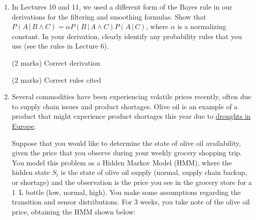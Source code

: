\documentclass[12pt]{article}
\begin{document}
\begin{enumerate}[font=\Large,label=(\alph*)]

\item
In Lectures 10 and 11, we used a different form of the Bayes rule in our derivations for the filtering and smoothing formulas. Show that $P(A\,|\,B \land C) = \alpha P(B\,|\,A \land C) P(A\,|\,C)$, where $\alpha$ is a normalizing constant. In your derivation, clearly identify any probability rules that you use (see the rules in Lecture 6).

\begin{markscheme}

(2 marks) Correct derivation

(2 marks) Correct rules cited

\end{markscheme}

\item
Several commodities have been experiencing volatile prices recently, often due to supply chain issues and product shortages. Olive oil is an example of a product that might experience product shortages this year due to \href{https://www.cnn.com/interactive/2022/09/business/olive-oil-shortage-drought-cnnphotos/}{droughts in Europe}.

Suppose that you would like to determine the state of olive oil availability, given the price that you observe during your weekly grocery shopping trip. You model this problem as a Hidden Markov Model (HMM), where the hidden state $S_t$ is the state of olive oil supply (normal, supply chain backup, or shortage) and the observation is the price you see in the grocery store for a \SI{1}{L} bottle (low, normal, high). You make some assumptions regarding the transition and sensor distributions. For 3 weeks, you take note of the olive oil price, obtaining the HMM shown below:

\begin{center}
\end{center}
\end{enumerate}
\end{document}
